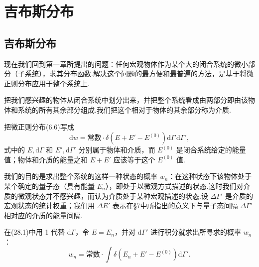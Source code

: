 %
\chapter{吉布斯分布}

\section{吉布斯分布}

现在我们回到第一章所提出的问题：任何宏观物体作为某个大的闭合系统的微小部分（子系统），求其分布函数.解决这个问题的最方便和最普遍的方法，是基于将微正则分布应用于整个系统上.

把我们感兴趣的物体从闭合系统中划分出来，并把整个系统看成由两部分即由该物体和系统的所有其余部分组成.我们把这个相对于物体的其余部分称为介质.

把微正则分布(6.6)写成
\begin{equation}
  \mathrm{d}w=\text{常数}\cdot\delta\left(E+E'-E^{(0)}\right)\mathrm{d}\varGamma\,\mathrm{d}\varGamma',
\end{equation}
式中的 $E,\mathrm{d}\varGamma$ 和 $E',\mathrm{d}\varGamma'$ 分别属于物体和介质，而 $E^{(0)}$ 是闭合系统给定的能量值；物体和介质的能量之和 $E+E'$ 应该等于这个 $E^{(0)}$ 值.

我们的目的是求出整个系统的这样一种状态的概率 $w_n$：在这种状态下该物体处于某个确定的量子态（具有能量 $E_n$），即处于以微观方式描述的状态.这时我们对介质的微观状态并不感兴趣，而认为介质处于某种宏观描述的状态.设 $\Delta\varGamma'$ 是介质的宏观状态的统计权重；我们用 $\Delta E'$ 表示在§7中所指出的意义下与量子态间隔 $\Delta\varGamma'$ 相对应的介质的能量间隔.

在(28.1)中用 1 代替 $\mathrm{d}\varGamma$，令 $E=E_n$，并对 $\mathrm{d}\varGamma'$ 进行积分就求出所寻求的概率 $w_n$：
\begin{equation*}
  w_n=\text{常数}\cdot\int\delta\left(E_n+E'-E^{(0)}\right)\mathrm{d}\varGamma'.
\end{equation*}


